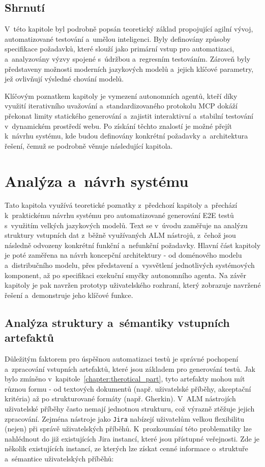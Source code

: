 \documentclass[czech, ing, kiv, he, iso690numb, viewonly]{fasthesis}
\begin{document}
\section{Shrnutí}
V~této kapitole byl podrobně popsán teoretický základ propojující agilní vývoj, automatizované testování a~umělou inteligenci.
Byly definovány způsoby specifikace požadavků, které slouží jako primární vstup pro automatizaci, a~analyzovány výzvy spojené s~údržbou a~regresním testováním. 
Zároveň byly představeny možnosti moderních jazykových modelů a~jejich klíčové parametry, jež ovlivňují výsledné chování modelů.

Klíčovým poznatkem kapitoly je vymezení autonomních agentů, kteří díky využití iterativního uvažování a~standardizovaného protokolu MCP dokáží překonat limity statického generování 
a~zajistit interaktivní a~stabilní testování v~dynamickém prostředí webu. Po získání těchto znalostí je možné přejít k~návrhu systému, kde budou definovány 
konkrétní požadavky a~architektura řešení, čemuž se podrobně věnuje následující kapitola.


\chapter{Analýza a~návrh systému}\label{chapter:system_design}
Tato kapitola využívá teoretické poznatky z~předchozí kapitoly a~přechází k~praktickému návrhu systému pro automatizované generování E2E testů s~využitím velkých jazykových modelů.
Text se v~úvodu zaměřuje na analýzu struktury vstupních dat z~běžně využívaných ALM nástrojů, z~čehož jsou následně odvozeny konkrétní funkční a~nefunkční požadavky.
Hlavní část kapitoly je poté zaměřena na návrh koncepční architektury - od doménového modelu a~distribučního modelu, přes představení a~vysvětlení 
jednotlivých systémových komponent, až po specifikaci exekuční smyčky autonomního agenta. Na závěr kapitoly je pak navržen prototyp uživatelského rozhraní,
který zobrazuje navržené řešení a~demonstruje jeho klíčové funkce.

\section{Analýza struktury a~sémantiky vstupních artefaktů}
Důležitým faktorem pro úspěšnou automatizaci testů je správné pochopení a~zpracování vstupních artefaktů, které jsou základem pro generování testů.
Jak bylo zmíněno v~kapitole~\ref{chapter:therotical_part}, tyto artefakty mohou mít různou formu - od textových dokumentů (např. uživatelské příběhy, akceptační kritéria) až po strukturované formáty (např. Gherkin).
V~ALM nástrojích uživatelské příběhy často nemají jednotnou strukturu, což výrazně ztěžuje jejich zpracování. Zejména nástroje jako \texttt{Jira} nabízejí 
uživatelům velkou flexibilitu (nejen) při správě uživatelských příběhů. K~prozkoumání této problematiky lze nahlédnout do 
již existujících Jira instancí, které jsou přístupné veřejnosti. Zde je několik existujících instancí, ze kterých lze získat 
cenné informace o~struktuře a~sémantice uživatelských příběhů:
\end{document}
